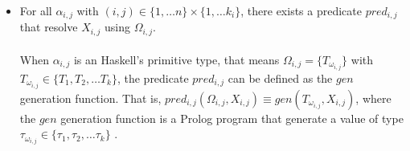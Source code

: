 \documentclass{report}
\theoremstyle{definition}
\newtheorem{example}{Example}[section]
\theoremstyle{definition}
\newcommand{\ttt}[1]{\texttt{#1}}
\begin{document}
\begin{itemize}
\begin{example}
\begin{itemize}
			\item As $\; \ttt{Weird} \;$ constructor requires both types \ttt{SomethingWeird Int String Bool} and  \ttt{String}, that is, $a_{3,1} = \ttt{SomethingWeird Int String Bool}$ and $a_{3,2} = \ttt{String}$, therefore $\Omega_{3,1} = \{\ttt{int}, \ttt{string}, \ttt{bool}\} \subseteq \{\ttt{int}, \ttt{string}, \ttt{bool}\}$ and $\Omega_{3,2} = \{\ttt{string}\} \subset \{\ttt{int}, \ttt{string}, \ttt{bool}\}$.
		\end{itemize}
	\end{example}
	\item For all $\alpha_{i,j}$ with $(i,j) \in \{1, \ldots n \} \times \{1, \ldots k_i \}$, there exists a predicate $pred_{i,j}$ that resolve $X_{i,j}$ using $\Omega_{i,j}$.\\\\
	When $\alpha_{i,j}$ is an Haskell's primitive type, that means $\Omega_{i,j} = \{T_{\omega_{i,j}}\}$ with $T_{\omega_{i,j}} \in \{ T_1 , T_2, \ldots T_k \}$, the predicate $pred_{i,j}$ can be defined as the $gen$ generation function. That is, $pred_{i,j}(\Omega_{i,j}, X_{i,j}) \equiv gen(T_{\omega_{i,j}}, X_{i,j})$, where the $gen$ generation function is a Prolog program that generate a value of type $\tau_{\omega_{i,j}} \in \{ \tau_1 , \tau_2, \ldots \tau_k \}$ .

\end{itemize}
\end{document}
